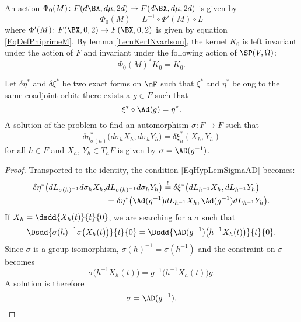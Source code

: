 An action $\Phi_{0}(M)\colon F(d\BX ,d\mu,2d)\to F(d\BX ,d\mu,2d)$ is given by
\begin{equation}
  \Phi_{0}(M)=L^{-1}\circ\Phi'(M)\circ L
\end{equation}
where $\Phi'(M)\colon F(\BX ,0,2)\to F(\BX ,0,2)$ is given by equation \eqref{EqDefPhiprimeM}. By lemma \ref{LemKerINvarIsom}, the kernel $K_{0}$ is left invariant under the action of $F$ and invariant under the following action of $\SP(V,\Omega)$:
\[ 
  \Phi_{0}(M)^*K_{0}=K_{0}.
\]
\begin{lemma}

Let $\delta\eta^*$ and $\delta\xi^*$ be two exact forms on $\mF$ such that $\xi^*$ and $\eta^*$ belong to the same coadjoint orbit: there exists a $g\in F$ such that
\begin{equation}
\xi^*\circ\Ad(g)=\eta^*.
\end{equation}
A solution of the problem to find an automorphism $\sigma\colon F\to F$ such that
\begin{equation} \label{EqHypLemSigmaAD}
\delta\eta^*_{\sigma(h)}\big( d\sigma_{h}X_{h},d\sigma_{h}Y_{h} \big)=\delta\xi^*_{h}(X_{h},Y_{h})
\end{equation}
for all $h\in F$ and $X_{h}$, $Y_{h}\in T_{h}F$ is given by $\sigma=\AD(g^{-1})$.
\label{LemJumpCoadOrb} 
\end{lemma}

\begin{proof}
Transported to the identity, the condition \eqref{EqHypLemSigmaAD} becomes:
\[ 
\begin{split}
\delta\eta^*\big( dL_{\sigma(h)^{-1}}d\sigma_{h}X_{h},&dL_{\sigma(h)^{-1}}d\sigma_{h}Y_{h}  \big)\stackrel{!}{=}\delta\xi^*\big( dL_{h^{-1}}X_{h},dL_{h^{-1}}Y_{h} \big)\\
		&=\delta\eta^*\big( \Ad(g^{-1})dL_{h^{-1}}X_{h},\Ad(g^{-1})dL_{h^{-1}}Y_{h}  \big).
  \end{split}
\]
 If $X_{h}=\dsdd{ X_{h}(t)}{t}{0}$, we are searching for a $\sigma$ such that
\[ 
  \Dsdd{ \sigma(h)^{-1}\sigma\big( X_{h}(t) \big) }{t}{0}=\Dsdd{ \AD(g^{-1})\big( h^{-1}X_{h}(t) \big) }{t}{0}.
\]
Since $\sigma$ is a group isomorphism, $\sigma(h)^{-1}=\sigma(h^{-1})$ and the constraint on $\sigma$ becomes
\[ 
  \sigma\big(h^{-1}X_{h}(t)\big)=g^{-1}\big( h^{-1}X_{h}(t) \big)g.
\]
A solution is therefore
\begin{equation}
\sigma=\AD(g^{-1}).
\end{equation}

\end{proof}
